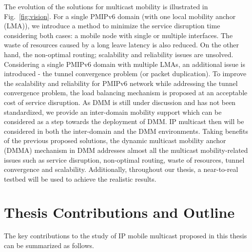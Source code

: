 The evolution of the solutions for multicast mobility is illustrated in Fig.~\ref{fig:vision}. For a single PMIPv6 domain (with one local mobility anchor (LMA)), we introduce a method to minimize the service disruption time considering both cases: a mobile node with single or multiple interfaces. The waste of resources caused by a long leave latency is also reduced. On the other hand, the non-optimal routing; scalability and reliability issues are unsolved. Considering a single PMIPv6 domain with multiple LMAs, an additional issue is introduced - the tunnel convergence problem (or packet duplication). To improve the scalability and reliability for PMIPv6 network while addressing the tunnel convergence problem, the load balancing mechanism is proposed at an acceptable cost of service disruption. As DMM is still under discussion and has not been standardized, we provide an inter-domain mobility support which can be considered as a step towards the deployment of DMM. IP multicast then will be considered in both the inter-domain and the DMM environments. Taking benefits of the previous proposed solutions, the dynamic multicast mobility anchor (DMMA) mechanism in DMM addresses almost all the multicast mobility-related issues such as service disruption, non-optimal routing, waste of resources, tunnel convergence and scalability. Additionally, throughout our thesis, a near-to-real testbed will be used to achieve the realistic results. 

\section{Thesis Contributions and Outline}
The key contributions to the study of IP mobile multicast proposed in this thesis can be summarized as follows.
